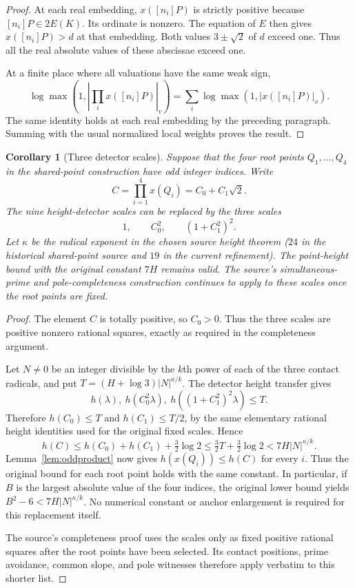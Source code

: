 \documentclass[11pt]{article}
\newtheorem{corollary}{Corollary}
\begin{document}
\begin{proof}
At each real embedding, $x([n_i]P)$ is strictly positive because
$[n_i]P\in2E(K)$. Its ordinate is nonzero. The equation of $E$ then gives
$x([n_i]P)>d$ at that embedding. Both values $3\pm\sqrt2$ of $d$ exceed
one. Thus all the real absolute values of these abscissae exceed one.

At a finite place where all valuations have the same weak sign,
\[
 \log\max\!\left(1,\left|\prod_i x([n_i]P)\right|_v\right)
 =\sum_i\log\max(1,|x([n_i]P)|_v).
\]
The same identity holds at each real embedding by the preceding
paragraph. Summing with the usual normalized local weights proves
the result.
\end{proof}

\begin{corollary}[Three detector scales]\label{cor:threescales}
Suppose that the four root points $Q_1,\ldots,Q_4$ in the shared-point
construction have odd integer indices. Write
\[
 C=\prod_{i=1}^4x(Q_i)=C_0+C_1\sqrt2.
\]
The nine height-detector scales can be replaced by the three scales
\[
 1,\qquad C_0^2,\qquad(1+C_1^2)^2.
\]
Let $\kappa$ be the radical exponent in the chosen source height theorem ($24$ in the historical shared-point source and $19$ in the current refinement). The point-height bound with the original constant $7H$ remains valid.
The source's simultaneous-prime and pole-completeness construction
continues to apply to these scales once the root points are fixed.
\end{corollary}
\begin{proof}
The element $C$ is totally positive, so $C_0>0$. Thus the three scales
are positive nonzero rational squares, exactly as required in the
completeness argument.

Let $N\ne0$ be an integer divisible by the $k$th power of each of the
three contact radicals, and put $T=(H+\log3)|N|^{\kappa/k}$. The detector
height transfer gives
\[
 h(\lambda),\ h(C_0^2\lambda),\ h((1+C_1^2)^2\lambda)\le T.
\]
Therefore $h(C_0)\le T$ and $h(C_1)\le T/2$, by the same elementary
rational height identities used for the original fixed scales. Hence
\[
 h(C)\le h(C_0)+h(C_1)+\tfrac32\log2
 \le\tfrac32T+\tfrac32\log2
 <7H|N|^{\kappa/k}.
\]
Lemma~\ref{lem:oddproduct} now gives $h(x(Q_i))\le h(C)$ for every $i$.
Thus the original bound for each root point holds with the same
constant. In particular, if $B$ is the largest absolute value of the
four indices, the original lower bound yields
$B^2-6<7H|N|^{\kappa/k}$. No numerical constant or anchor enlargement is
required for this replacement itself.

The source's completeness proof uses the scales only as fixed positive
rational squares after the root points have been selected. Its contact
positions, prime avoidance, common slope, and pole witnesses therefore
apply verbatim to this shorter list.
\end{proof}
\end{document}
